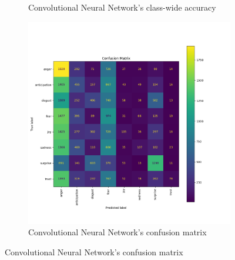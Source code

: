 \begin{figure}[H]
\begin{subfigure}{0.5\textwidth}
        \caption{Convolutional Neural Network's class-wide accuracy}
        \label{fig:cnn_classacc}
    \end{subfigure}
    \begin{subfigure}{0.65\textwidth}
        \includegraphics[width=\textwidth]{pictures/cnn_confusion_matrix.png}
        \caption{Convolutional Neural Network's confusion matrix}
        \label{fig:cnn_confmatr}
    \end{subfigure}
    \label{fig:cnn_performances}
\end{figure}



